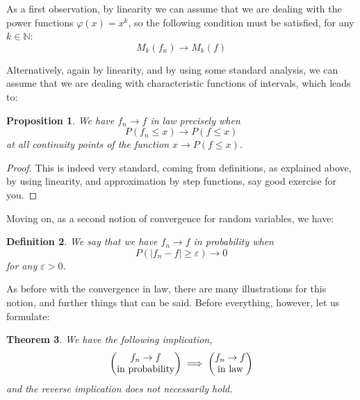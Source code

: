 \documentclass[12pt]{amsbook}
\newtheorem{theorem}{Theorem}[chapter]
\newtheorem{definition}[theorem]{Definition}
\newtheorem{proposition}[theorem]{Proposition}
\begin{document}
As a first observation, by linearity we can assume that we are dealing with the power functions $\varphi(x)=x^k$, so the following condition must be satisfied, for any $k\in\mathbb N$:
$$M_k(f_n)\to M_k(f)$$

Alternatively, again by linearity, and by using some standard analysis, we can assume that we are dealing with characteristic functions of intervals, which leads to:

\begin{proposition}
We have $f_n\to f$ in law precisely when
$$P(f_n\leq x)\to P(f\leq x)$$
at all continuity points of the function $x\to P(f\leq x)$.
\end{proposition}

\begin{proof}
This is indeed very standard, coming from definitions, as explained above, by using linearity, and approximation by step functions, say good exercise for you.
\end{proof}

Moving on, as a second notion of convergence for random variables, we have:


\begin{definition}
We say that we have $f_n\to f$ in probability when 
$$P(|f_n-f|\geq\varepsilon)\to 0$$
for any $\varepsilon>0$.
\end{definition}

As before with the convergence in law, there are many illustrations for this notion, and further things that can be said. Before everything, however, let us formulate:

\begin{theorem}
We have the following implication,
$$\begin{pmatrix}f_n\to f\\ {\rm in\ probability}\end{pmatrix}\implies
\begin{pmatrix}f_n\to f\\ {\rm in\ law}\end{pmatrix}$$
and the reverse implication does not necessarily hold.
\end{theorem}
\end{document}
